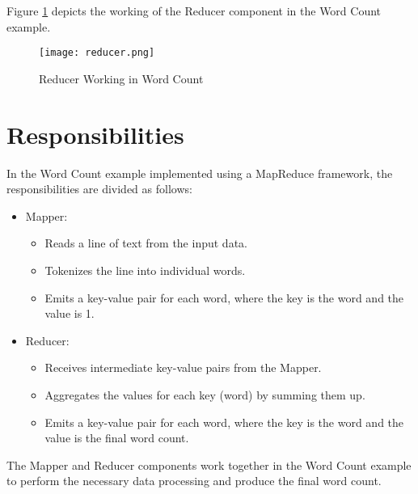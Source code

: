 \documentclass{article}
\begin{document}
Figure \ref{fig:reducer} depicts the working of the Reducer component in the Word Count example.

\begin{figure}[h]
  \centering
  \texttt{[image: reducer.png]}
  \caption{Reducer Working in Word Count}
  \label{fig:reducer}
\end{figure}

\section{Responsibilities}

In the Word Count example implemented using a MapReduce framework, the responsibilities are divided as follows:

\begin{itemize}
  \item Mapper:
  \begin{itemize}
    \item Reads a line of text from the input data.
    \item Tokenizes the line into individual words.
    \item Emits a key-value pair for each word, where the key is the word and the value is 1.
  \end{itemize}
  \item Reducer:
  \begin{itemize}
    \item Receives intermediate key-value pairs from the Mapper.
    \item Aggregates the values for each key (word) by summing them up.
    \item Emits a key-value pair for each word, where the key is the word and the value is the final word count.
  \end{itemize}
\end{itemize}

The Mapper and Reducer components work together in the Word Count example to perform the necessary data processing and produce the final word count.
\end{document}
